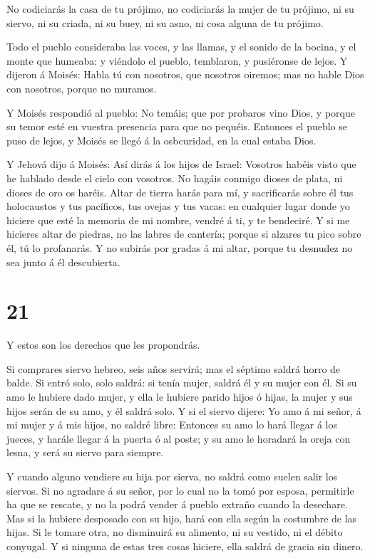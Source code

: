 No codiciarás la casa de tu prójimo, no codiciarás la
mujer de tu prójimo, ni su siervo, ni su criada, ni su buey, ni su asno,
ni cosa alguna de tu prójimo.

 Todo el pueblo consideraba las voces, y las llamas, y el
sonido de la bocina, y el monte que humeaba: y viéndolo el pueblo,
temblaron, y pusiéronse de lejos.  Y dijeron á Moisés:
Habla tú con nosotros, que nosotros oiremos; mas no hable Dios con
nosotros, porque no muramos.

 Y Moisés respondió al pueblo: No temáis; que por probaros
vino Dios, y porque su temor esté en vuestra presencia para que no
pequéis.  Entonces el pueblo se puso de lejos, y Moisés se
llegó á la osbcuridad, en la cual estaba Dios.

 Y Jehová dijo á Moisés: Así dirás á los hijos de Israel:
Vosotros habéis visto que he hablado desde el cielo con vosotros.
 No hagáis conmigo dioses de plata, ni dioses de oro os
haréis.  Altar de tierra harás para mí, y sacrificarás
sobre él tus holocaustos y tus pacíficos, tus ovejas y tus vacas: en
cualquier lugar donde yo hiciere que esté la memoria de mi nombre,
vendré á ti, y te bendeciré.  Y si me hicieres altar de
piedras, no las labres de cantería; porque si alzares tu pico sobre él,
tú lo profanarás.  Y no subirás por gradas á mi altar,
porque tu desnudez no sea junto á él descubierta.

\hypertarget{section-20}{%
\section{21}\label{section-20}}

 Y estos son los derechos que les propondrás.

 Si comprares siervo hebreo, seis años servirá; mas el
séptimo saldrá horro de balde.  Si entró solo, solo saldrá:
si tenía mujer, saldrá él y su mujer con él.  Si su amo le
hubiere dado mujer, y ella le hubiere parido hijos ó hijas, la mujer y
sus hijos serán de su amo, y él saldrá solo.  Y si el siervo
dijere: Yo amo á mi señor, á mi mujer y á mis hijos, no saldré libre:
 Entonces su amo lo hará llegar á los jueces, y harále
llegar á la puerta ó al poste; y su amo le horadará la oreja con lesna,
y será su siervo para siempre.

 Y cuando alguno vendiere su hija por sierva, no saldrá como
suelen salir los siervos.  Si no agradare á su señor, por lo
cual no la tomó por esposa, permitirle ha que se rescate, y no la podrá
vender á pueblo extraño cuando la desechare.  Mas si la
hubiere desposado con su hijo, hará con ella según la costumbre de las
hijas.  Si le tomare otra, no disminuirá su alimento, ni su
vestido, ni el débito conyugal.  Y si ninguna de estas tres
cosas hiciere, ella saldrá de gracia sin dinero.


